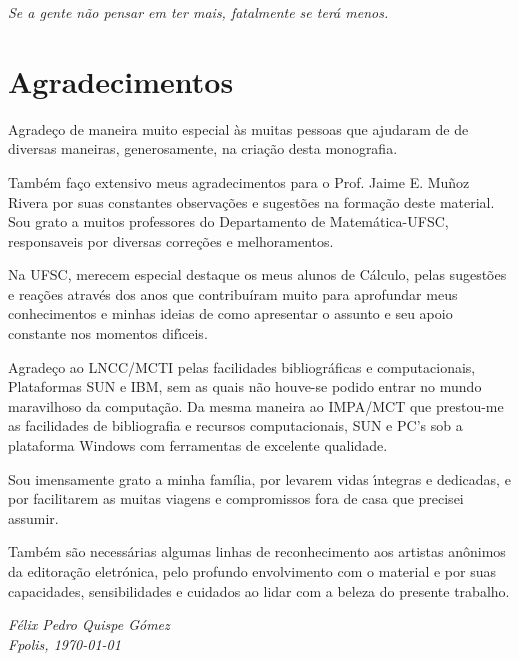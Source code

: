 \newpage
\vspace*{9.0cm}
\begin{flushright}
\it Se a gente n\~ao pensar em ter mais,  fatalmente se ter\'a menos.
\end{flushright}

\newpage
\vspace{4cm}
\chapter*{Agradecimentos}

Agradeço de maneira muito especial às muitas pessoas que ajudaram de de diversas maneiras, generosamente, na criação desta monografia.

Tamb\'em fa\c co extensivo meus agradecimentos para o Prof. Jaime E. Muñoz Rivera por suas constantes observa\c c\~oes e sugest\~oes na forma\c c\~ao deste material. Sou grato a muitos professores do Departamento de Matemática-UFSC, responsaveis por diversas correções e melhoramentos.

Na UFSC, merecem especial destaque os meus alunos de Cálculo, pelas sugestões e reações através dos anos que contribuíram muito para aprofundar meus conhecimentos e minhas ideias de como apresentar o assunto e seu apoio constante nos momentos dif\'\i ceis.

Agrade\c co ao LNCC/MCTI pelas facilidades bibliográficas e computacionais, Plataformas SUN e IBM, sem as quais n\~ao houve-se podido entrar no mundo maravilhoso da computa\c c\~ao. Da mesma maneira ao IMPA/MCT que prestou-me as facilidades de biblio\-grafia e recursos computacionais, SUN e PC's sob a plataforma Windows  com ferramentas de excelente qualidade.

Sou imensamente grato a minha família, por levarem vidas \'\i ntegras e dedicadas, e por facilitarem as muitas viagens e compromissos fora de casa que precisei assumir.

Tamb\'em s\~ao necess\'arias algumas linhas de reconhecimento aos artistas an\^onimos da editora\c c\~ao eletr\'onica, pelo profundo envolvimento com o material e por suas capacidades, sensibilidades e cuidados ao lidar com a beleza do presente trabalho.

\begin{flushright}
\it F\'elix Pedro Quispe G\'omez\\
Fpolis, \today
\end{flushright}

